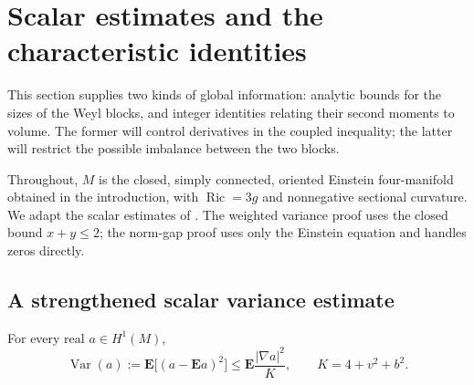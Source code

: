 \section{Scalar estimates and the characteristic identities}
\label{sec:analytic}

This section supplies two kinds of global information: analytic bounds
for the sizes of the Weyl blocks, and integer identities relating their
second moments to volume. The former will control derivatives in the
coupled inequality; the latter will restrict the possible imbalance
between the two blocks.

Throughout, $M$ is the closed, simply connected, oriented Einstein
four-manifold obtained in the introduction, with $\operatorname{Ric}=3g$
and nonnegative sectional curvature. We adapt the scalar estimates of
\cite[Propositions~3.1--3.4]{OpenAI2026P}. The weighted variance proof
uses the closed bound $x+y\le2$; the norm-gap proof uses only the
Einstein equation and handles zeros directly.

\subsection{A strengthened scalar variance estimate}

\begin{proposition}
\label{prop:weighted-variance}
For every real $a\in H^1(M)$,
\begin{equation}
 \operatorname{Var}(a)
 :=\mathbf E\bigl[(a-\mathbf E a)^2\bigr]
 \le\mathbf E\frac{|\nabla a|^2}{K},
 \qquad K=4+v^2+b^2.
 \tag{4}\label{eq:4}
\end{equation}
\end{proposition}

